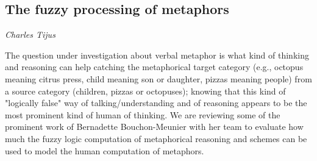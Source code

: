 \documentclass[../booklet.tex]{subfiles}
\begin{document}
\subsection[The fuzzy processing of metaphors. {\it Charles Tijus}]{The fuzzy processing of metaphors}

\begin{center}
  {\it Charles Tijus}
\end{center}

\vskip 0.8cm

The question under investigation about verbal metaphor is what kind of thinking and reasoning can help catching the metaphorical target category (e.g., octopus meaning citrus press,  child meaning son or daughter,  pizzas meaning people) from a source category (children, pizzas or octopuses); knowing that this kind of "logically false" way of talking/understanding and of reasoning appears to be the most prominent kind of human of thinking. We are reviewing some of the prominent work of Bernadette Bouchon-Meunier with her team to evaluate how much the fuzzy logic computation of metaphorical reasoning and schemes can be used to model the human computation of metaphors.

\end{document}
